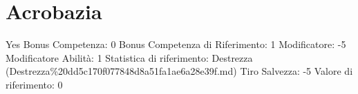 \section{Acrobazia}\label{acrobazia}

\begin{description}
\tightlist
\item[Tags: ABI]
Yes Bonus Competenza: 0 Bonus Competenza di Riferimento: 1 Modificatore:
-5 Modificatore Abilità: 1 Statistica di riferimento: Destrezza
(Destrezza\%20dd5c170f077848d8a51fa1ae6a28e39f.md) Tiro Salvezza: -5
Valore di riferimento: 0
\end{description}

